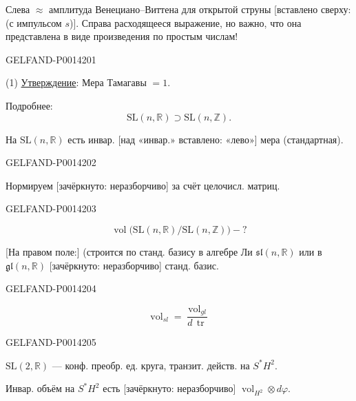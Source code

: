 Слева \(\approx\) амплитуда Венециано–Виттена для открытой струны [вставлено сверху: (с импульсом \(s\))].
Справа расходящееся выражение, но важно, что она представлена в виде произведения по простым числам!


\begin{GelfandAdjacentEvidence}{GELFAND-P001420}{1}


(1) \uline{Утверждение}: Мера Тамагавы \(=1\).

Подробнее:
\[
\mathrm{SL}(n,\mathbb R)\supset\mathrm{SL}(n,\mathbb Z).
\]

На \(\mathrm{SL}(n,\mathbb R)\) есть инвар.
[над «инвар.» вставлено: «лево»] мера (стандартная).
\end{GelfandAdjacentEvidence}
\begin{GelfandAdjacentEvidence}{GELFAND-P001420}{2}


Нормируем [зачёркнуто: неразборчиво] за счёт целочисл. матриц.
\end{GelfandAdjacentEvidence}
\begin{GelfandAdjacentEvidence}{GELFAND-P001420}{3}

\[
\operatorname{vol}\bigl(\mathrm{SL}(n,\mathbb R)/\mathrm{SL}(n,\mathbb Z)\bigr)-?
\]

[На правом поле:]
(строится по станд. базису в алгебре Ли \(\mathfrak{sl}(n,\mathbb R)\) или в \(\mathfrak{gl}(n,\mathbb R)\)
[зачёркнуто: неразборчиво] станд. базис.
\end{GelfandAdjacentEvidence}
\begin{GelfandAdjacentEvidence}{GELFAND-P001420}{4}

\[
\boxed{\operatorname{vol}_{sl}=\frac{\operatorname{vol}_{gl}}{d\,\operatorname{tr}}}
\]
\end{GelfandAdjacentEvidence}
\begin{GelfandAdjacentEvidence}{GELFAND-P001420}{5}


\(\mathrm{SL}(2,\mathbb R)\) — конф. преобр. ед. круга, транзит. действ. на
\(S^*H^2\).

Инвар. объём на \(S^*H^2\) есть [зачёркнуто: неразборчиво]
\(\operatorname{vol}_{H^2}\otimes d\varphi\).
\end{GelfandAdjacentEvidence}
